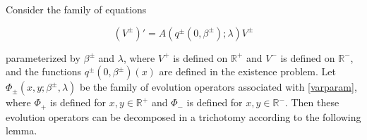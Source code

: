 \documentclass[12pt]{article}
\def\R{{\mathbb R}}
\begin{document}
Consider the family of equations

\begin{equation}\label{varparam}
(V^\pm)' = A(q^\pm(0, \beta^\pm); \lambda) V^\pm
\end{equation}

parameterized by $\beta^\pm$ and $\lambda$, where $V^+$ is defined on $\R^+$ and $V^-$ is defined on $\R^-$, and the functions $q^\pm(0, \beta^\pm)(x)$ are defined in the existence problem. Let $\Phi_\pm(x, y; \beta^\pm, \lambda)$ be the family of evolution operators associated with \eqref{varparam}, where $\Phi_+$ is defined for $x, y \in \R^+$ and $\Phi_-$ is defined for $x, y \in \R^-$. Then these evolution operators can be decomposed in a trichotomy according to the following lemma.

\end{document}
